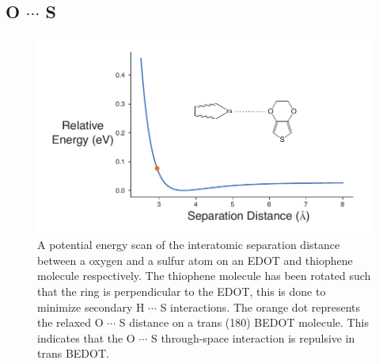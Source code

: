 \subsection{\texorpdfstring{O $\cdots$ S}{OS}}
\begin{figure}[hbt!]
    \centering
    \includegraphics{figures/append_aroma/ts_t_edot_copy.pdf}
    \caption{A potential energy scan of the interatomic separation distance between a oxygen and a sulfur atom on an EDOT and thiophene molecule respectively. The thiophene molecule has been rotated such that the ring is perpendicular to the EDOT, this is done to minimize secondary H $\cdots$ S interactions. The orange dot represents the relaxed O $\cdots$ S distance on a trans (180\textdegree) BEDOT molecule. This indicates that the O $\cdots$ S through-space interaction is repulsive in trans BEDOT.}
    \label{fig:ts_t_edot}
\end{figure}
\clearpage

